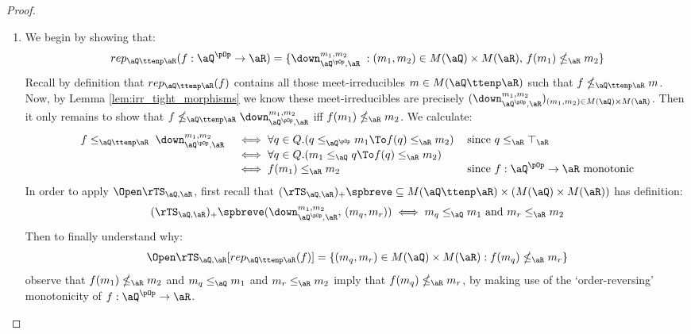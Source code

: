 \documentclass{article}
\begin{document}
\begin{proof}
\item
\begin{enumerate}
\item
We begin by showing that:
\[
rep_{\aQ \ttenp \aR}(f : \aQ^{\pOp} \to \aR)
= \{ \down_{\aQ^{\pOp},\aR}^{m_1,m_2} \; : (m_1,m_2) \in M(\aQ) \times M(\aR), \, f(m_1) \nleq_\aR m_2 \}
\]
Recall by definition that $rep_{\aQ \ttenp \aR}(f)$ contains all those meet-irreducibles $m \in M(\aQ \ttenp \aR)$ such that $f \nleq_{\aQ \ttenp \aR} m$. Now, by Lemma \ref{lem:irr_tight_morphisms} we know these meet-irreducibles are precisely $(\down_{\aQ^{\pOp},\aR}^{m_1,m_2})_{(m_1,m_2) \in M(
\aQ) \times M(\aR)}$. Then it only remains to show that $f \nleq_{\aQ \ttenp \aR} \down_{\aQ^{\pOp},\aR}^{m_1,m_2}$ iff $f(m_1) \nleq_\aR m_2$. We calculate:
\[
\begin{tabular}{lll}
$f \leq_{\aQ \ttenp \aR} \; \down_{\aQ^{\pOp},\aR}^{m_1,m_2}$
&
$\iff \forall q \in Q.( q \leq_{\aQ^{\pOp}} m_1 \To f(q) \leq_\aR m_2)$
& since $q \leq_\aR \top_\aR$
\\&
$\iff  \forall q \in Q.( m_1 \leq_\aQ q \To f(q) \leq_\aR m_2)$
\\&
$\iff  f(m_1) \leq_\aR m_2$
& since $f : \aQ^{\pOp} \to \aR$ monotonic
\end{tabular}
\] 
In order to apply $\Open\rTS_{\aQ,\aR}$, first recall that $(\rTS_{\aQ,\aR})_+\spbreve \subseteq M(\aQ \ttenp \aR) \times (M(\aQ) \times M(\aR))$ has definition:
\[
(\rTS_{\aQ,\aR})_+\spbreve(\down_{\aQ^{\pOp},\aR}^{m_1,m_2},\,(m_q,m_r))
\iff
m_q \leq_\aQ m_1 \text{ and } m_r \leq_\aR m_2
\]
Then to finally understand why:
\[
\Open\rTS_{\aQ,\aR}[rep_{\aQ \ttenp \aR}(f)]
= \{ (m_q,m_r) \in M(\aQ) \times M(\aR) : f(m_q) \nleq_\aR m_r \}
\]
observe that $f(m_1) \nleq_\aR m_2$ and $m_q \leq_\aQ m_1$ and $m_r \leq_\aR m_2$ imply that $f(m_q) \nleq_\aR m_r$, by making use of the `order-reversing' monotonicity of $f : \aQ^{\pOp} \to \aR$.


\end{enumerate}
\end{proof}
\end{document}
